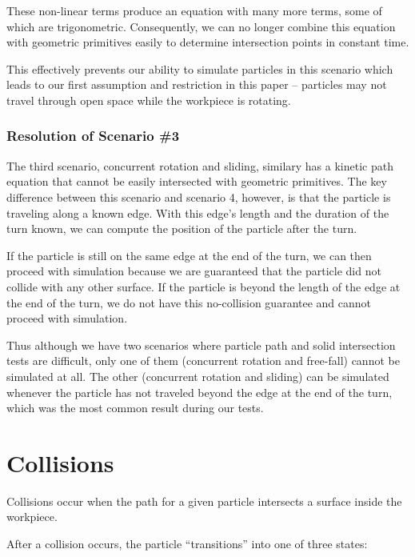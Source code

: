These non-linear terms produce an equation with many more terms, some of which are trigonometric. Consequently, we can no longer combine this equation with geometric primitives easily to determine intersection points in constant time.

This effectively prevents our ability to simulate particles in this scenario which leads to our first assumption and restriction in this paper -- particles may not travel through open space while the workpiece is rotating.

		\subsubsection{Resolution of Scenario \#3}

The third scenario, concurrent rotation and sliding, similary has a kinetic path equation that cannot be easily intersected with geometric primitives. The key difference between this scenario and scenario 4, however, is that the particle is traveling along a known edge. With this edge's length and the duration of the turn known, we can compute the position of the particle after the turn.

If the particle is still on the same edge at the end of the turn, we can then proceed with simulation because we are guaranteed that the particle did not collide with any other surface. If the particle is beyond the length of the edge at the end of the turn, we do not have this no-collision guarantee and cannot proceed with simulation.

Thus although we have two scenarios where particle path and solid intersection tests are difficult, only one of them (concurrent rotation and free-fall) cannot be simulated at all. The other (concurrent rotation and sliding) can be simulated whenever the particle has not traveled beyond the edge at the end of the turn, which was the most common result during our tests.


	\section{Collisions}

Collisions occur when the path for a given particle intersects a surface inside the workpiece.


After a collision occurs, the particle ``transitions'' into one of three states:

